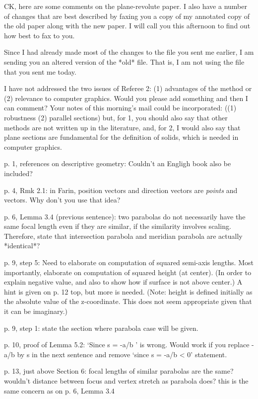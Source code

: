 CK, here are some comments on the plane-revolute paper.
	I also have a number of changes that are best described
	by faxing you a copy of my annotated copy of the old paper
	along with the new paper.
	I will call you this afternoon to find out how best to fax to you.

	Since I had already made most of the changes to the file
	you sent me earlier, I am sending you an altered version
	of the *old* file.
	That is, I am not using the file that you sent me today.
	
	I have not addressed the two issues of Referee 2:
	(1) advantages of the method or (2) relevance to computer graphics.
	Would you please add something and then I can comment?
	Your notes of this morning's mail could be incorporated:
	((1) robustness (2) parallel sections)
	but, for 1, you should also say that other methods are not written up
	in the literature, 
	and, for 2, I would also say that plane sections are fundamental 
	for the definition of solids, which is needed in computer
	graphics.

p. 1, references on descriptive geometry: Couldn't an Engligh book also
	be included?

p. 4, Rmk 2.1: in Farin, position vectors and direction vectors are 
	{\em points} and vectors.  Why don't you use that idea?

p. 6, Lemma 3.4 (previous sentence): two parabolas do not necessarily have
	the same focal length even if they are similar, if the similarity
	involves scaling.  Therefore, state that intersection parabola
	and meridian parabola are actually *identical*?

p. 9, step 5: 	Need to elaborate on computation of squared semi-axis lengths.
	Most importantly, elaborate on computation of squared height (at center).
	(In order to explain negative value, and also to show how if surface
	is not above center.)
	A hint is given on p. 12 top, but more is needed.
	(Note: height is defined initially as the absolute value of the
	z-coordinate.  This does not seem appropriate given that it can be
	imaginary.)

p. 9, step 1: state the section where parabola case will be given.

p. 10, proof of Lemma 5.2: `Since s = -a/b ' is wrong.
	Would work if you replace -a/b by s in the next sentence
	and remove `since s = -a/b < 0' statement.

p. 13, just above Section 6: focal lengths of similar parabolas are the same?
	wouldn't distance between focus and vertex stretch as parabola does?
	this is the same concern as on p. 6, Lemma 3.4


